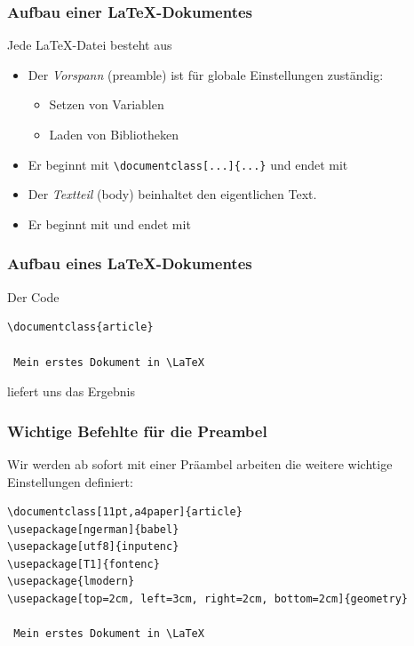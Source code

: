 \begin{frame}[fragile]
\frametitle{Aufbau einer \LaTeX-Dokumentes}
Jede \LaTeX-Datei besteht aus
\begin{itemize}[<+->]
  \item Der \emph{Vorspann} (preamble) ist für globale Einstellungen zuständig:
  \begin{itemize}
    \item Setzen von Variablen
    \item Laden von Bibliotheken
  \end{itemize}
  \item Er beginnt mit \lstinline[style=Latex]+\documentclass[...]{...}+ und endet mit \lstinline[style=Latex]++
  \item Der \emph{Textteil} (body) beinhaltet den eigentlichen Text.
  \item Er beginnt mit \lstinline[style=Latex]++ und endet mit \lstinline[style=Latex]++
\end{itemize}
\end{frame}

\begin{frame}[fragile]
\frametitle{Aufbau eines \LaTeX-Dokumentes}
Der Code
\begin{lstlisting}[style=Latex]
\documentclass{article}

 Mein erstes Dokument in \LaTeX

\end{lstlisting} 
\pause
liefert uns das Ergebnis
\end{frame}

\begin{frame}[fragile]
\frametitle{Wichtige Befehlte für die Preambel}
Wir werden ab sofort mit einer Präambel arbeiten die weitere wichtige Einstellungen definiert: 
\begin{lstlisting}[style=Latex]
\documentclass[11pt,a4paper]{article}
\usepackage[ngerman]{babel}
\usepackage[utf8]{inputenc}
\usepackage[T1]{fontenc}
\usepackage{lmodern}
\usepackage[top=2cm, left=3cm, right=2cm, bottom=2cm]{geometry}

 Mein erstes Dokument in \LaTeX

\end{lstlisting} 
\end{frame}


